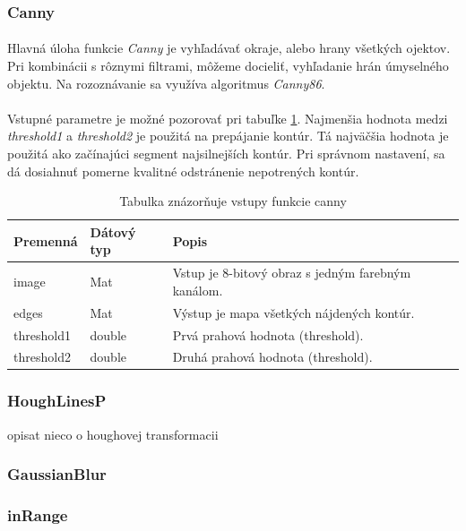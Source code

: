 \documentclass[12pt]{article}
\begin{document}
\subsubsection{Canny}
\paragraph{}
Hlavná úloha funkcie \emph{Canny} je vyhľadávať okraje, alebo hrany všetkých ojektov. Pri kombinácii s rôznymi filtrami, môžeme docieliť, vyhľadanie hrán úmyselného objektu.
Na rozoznávanie sa využíva algoritmus \emph{Canny86}.
\cite{canny}
\cite{OpenCVDoc}
\cite{JCanny}
\cite{canny_wiki_en}
\paragraph{}
Vstupné parametre je možné pozorovať pri tabuľke \ref{cannyPar}.
Najmenšia hodnota medzi \emph{threshold1} a \emph{threshold2} je použitá na prepájanie kontúr. Tá najväčšia hodnota je použitá ako začínajúci segment najsilnejších kontúr.
Pri správnom nastavení, sa dá dosiahnuť pomerne kvalitné odstránenie nepotrených kontúr.
\cite{canny}
\cite{OpenCVDoc}
\begin{table}
	\centering
    \begin{tabular}{ | l | l | p{5cm} |}
    \hline
    Premenná & Dátový typ & Popis \\ \hline
    image & Mat & Vstup je 8-bitový obraz s jedným farebným kanálom. \\ \hline
    edges & Mat & Výstup je mapa všetkých nájdených kontúr. \\ \hline
    threshold1 & double & Prvá prahová hodnota (threshold). \\ \hline
    threshold2 & double & Druhá prahová hodnota (threshold). \\
    \hline
    \end{tabular}
  	\caption{Tabulka znázorňuje vstupy funkcie canny}
  	\label{cannyPar}
\end{table}
\subsubsection{HoughLinesP}
opisat nieco o houghovej transformacii
\subsubsection{GaussianBlur}
\subsubsection{inRange}
\end{document}
